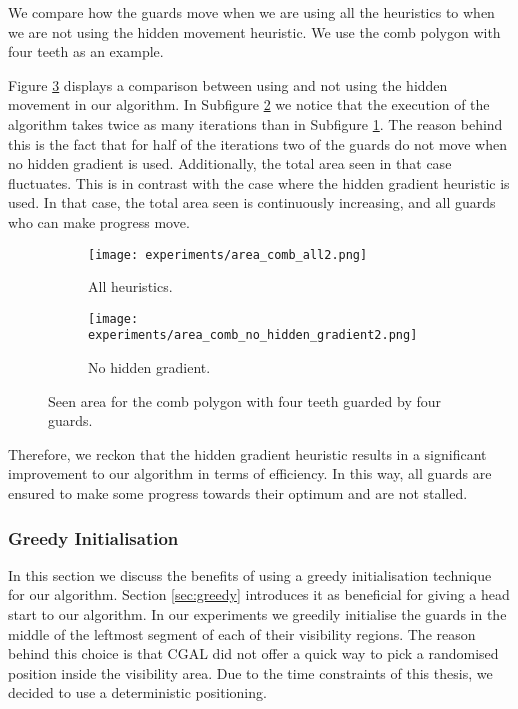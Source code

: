 We  compare how the guards move when we are using all the heuristics to when we are not using the hidden movement heuristic. We  use the comb polygon with four teeth as an example. 

Figure \ref{fig:area_no_hidden_gradient} displays a comparison between using and not using the hidden movement in our algorithm. In Subfigure \ref{fig:area_comb_no_hidden_gradient} we  notice that the execution of the algorithm takes twice as many iterations than in Subfigure \ref{fig:area_comb_all2}. The reason behind this is the fact that for half of the iterations two of the guards do not move when no hidden gradient is used. Additionally, the total area seen in that case fluctuates. This is in contrast with the case where the hidden gradient heuristic is used. In that case, the total area seen is continuously increasing, and all guards who can make progress move.

\begin{figure}[h!]
    \centering
    \begin{subfigure}{0.45\textwidth}
        \texttt{[image: experiments/area\_comb\_all2.png]}
        \caption{All heuristics.}
        \label{fig:area_comb_all2}
    \end{subfigure}
    \hfill
    \begin{subfigure}{0.45\textwidth}
        \texttt{[image: experiments/area\_comb\_no\_hidden\_gradient2.png]}
        \caption{No hidden gradient.}
        \label{fig:area_comb_no_hidden_gradient}
    \end{subfigure}
    \caption{Seen area for the comb polygon with four teeth guarded by four guards.}
    \label{fig:area_no_hidden_gradient}
\end{figure}

Therefore, we reckon that the hidden gradient heuristic results in a significant improvement to our algorithm in terms of efficiency. In this way, all guards are ensured to make some progress towards their optimum and are not stalled.

\newpage
\subsubsection{Greedy Initialisation}
In this section we  discuss the benefits of using a greedy initialisation technique for our algorithm. Section \ref{sec:greedy} introduces it as beneficial for giving a head start to our algorithm. In our experiments we  greedily initialise the guards in the middle of the leftmost segment of each of their visibility regions. The reason behind this choice is that CGAL did not offer a quick way to pick a randomised position inside the visibility area. Due to the time constraints of this thesis, we decided to use a deterministic positioning.

